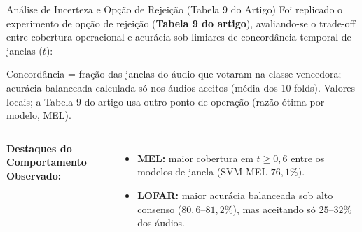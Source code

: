 \documentclass[aspectratio=169]{beamer}
\begin{document}
\begin{frame}{An\'{a}lise de Incerteza e Op\c{c}\~{a}o de Rejei\c{c}\~{a}o (Tabela 9 do Artigo)}
    \small
    Foi replicado o experimento de op\c{c}\~{a}o de rejei\c{c}\~{a}o (\textbf{Tabela 9 do artigo}), avaliando-se o trade-off entre cobertura operacional e acur\'{a}cia sob limiares de concord\^{a}ncia temporal de janelas ($t$):
    
    \vspace{0.1cm}
    \begin{table}[h]
    \centering
    \end{table}
    \vspace{-0.2cm}
    {\tiny Concord\^{a}ncia = fra\c{c}\~{a}o das janelas do \'{a}udio que votaram na classe vencedora; acur\'{a}cia balanceada calculada s\'{o} nos \'{a}udios aceitos (m\'{e}dia dos 10 folds). Valores locais; a Tabela 9 do artigo usa outro ponto de opera\c{c}\~{a}o (raz\~{a}o \'{o}tima por modelo, MEL).\par}

    \vspace{0.05cm}
    \begin{columns}[T]
        \footnotesize
        \textbf{Destaques do Comportamento Observado:}
        \begin{itemize}
            \item \textbf{MEL:} maior cobertura em $t \ge 0,6$ entre os modelos de janela (SVM MEL $76,1\%$).
            \item \textbf{LOFAR:} maior acur\'{a}cia balanceada sob alto consenso ($80,6$--$81,2\%$), mas aceitando s\'{o} $25$--$32\%$ dos \'{a}udios.
        \end{itemize}


\end{columns}
\end{frame}
\end{document}
